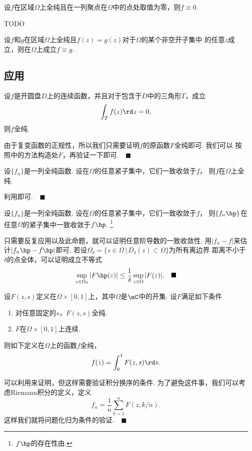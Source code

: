   \begin{thm}
    设$f$在区域$\Omega$上全纯且在一列聚点在$\Omega$中的点处取值为零，则$f\equiv 0$.
  \end{thm}
  \proof
    TODO

  \begin{cor}
    设$f$和$g$在区域$\Omega$上全纯且$f(z)=g(z)$对于$\Omega$的某个非空开子集中
    的任意$z$成立，则在$\Omega$上成立$f\equiv g$.
  \end{cor}

\subsection{应用}

  \begin{thm}[Morera]
    \label{thm: Morera}
    设$f$是开圆盘$D$上的连续函数，并且对于包含于$D$中的三角形$T$，成立
    \[
      \int_T f(z)\rd z = 0,
    \]
    则$f$全纯.
  \end{thm}
  \proof
    由于复变函数的正规性，所以我们只需要证明$f$的原函数$F$全纯即可. 我们可以
    按照中的方法构造处$F$，再验证一下即可.$\quad\blacksquare$

  \begin{thm}[级数]
    \label{thm: 级数、全纯}
    设$\{f_n\}$是一列全纯函数. 设在$\Omega$的任意紧子集中，它们一致收敛于$f$，
    则$f$在$\Omega$上全纯.
  \end{thm}
  \proof
    利用即可.$\quad\blacksquare$

  \begin{thm}
    设$\{f_n\}$是一列全纯函数. 设在$\Omega$的任意紧子集中，它们一致收敛于$f$，
    则$\{f_n\hp\}$在任意$\Omega$的紧子集中一致收敛于$f\hp$.
    \footnote{$f\hp$的存在性由.}
  \end{thm}
  \remark
    只需要反复应用以及此命题，就可以证明任意阶导数的一致收敛性.
  \proof
    用$|f_n-f|$来估计$|f_n\hp-f\hp|$即可. 若设$\Omega_\delta=
    \{z\in\Omega\,|\, \overline{D_\delta}(z)\subset\Omega\}$为所有离边界
    距离不小于$\delta$的点全体，可以证明成立不等式
    \[
      \sup_{z\in\Omega_\delta}|F\hp(z)| \le \frac{1}{\delta}\sup_{z\in\Omega}|F(z)|.
      \quad\blacksquare
    \]

  \begin{thm}[含参积分]
    设$F(z,s)$定义在$\Omega\times[0, 1]$上，其中$\Omega$是$\mC$中的开集.
    设$F$满足如下条件
    \begin{enumerate}
      \item 对任意固定的$s$，$F(z, s)$全纯.
      \item $F$在$\Omega\times[0, 1]$上连续.
    \end{enumerate}
    则如下定义在$\Omega$上的函数$f$全纯，
    \[
      f(z) = \int_0^1F(z,s)\rd s.
    \]
  \end{thm}
  \proof
    可以利用来证明，但这样需要验证积分换序的条件.
    为了避免这件事，我们可以考虑Riemann积分的定义，定义
    \[
      f_n = \frac{1}{n}\sum_{k=1}^nF(z,k/n).
    \]
    这样我们就将问题化归为条件的验证.$\quad\blacksquare$

